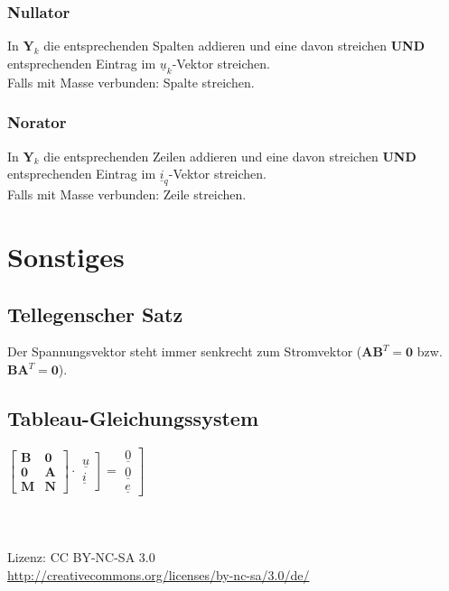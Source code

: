 \documentclass[a4paper,twocolumn,10pt]{article}
\begin{document}
\subsubsection*{Nullator}
In $\textbf{Y}_k$ die entsprechenden Spalten addieren und eine davon streichen \textbf{UND} entsprechenden Eintrag im $\underline{u}_k$-Vektor streichen.\\
Falls mit Masse verbunden: Spalte streichen.
\subsubsection*{Norator}
In $\textbf{Y}_k$ die entsprechenden Zeilen addieren und eine davon streichen \textbf{UND} entsprechenden Eintrag im $\underline{i}_q$-Vektor streichen.\\
Falls mit Masse verbunden: Zeile streichen.

\section*{Sonstiges}
\subsection*{Tellegenscher Satz}
Der Spannungsvektor steht immer senkrecht zum Stromvektor ($\textbf{A}\textbf{B}^T=\textbf{0}$ bzw. $\textbf{B}\textbf{A}^T=\textbf{0}$).

\subsection*{Tableau-Gleichungssystem}
$\begin{bmatrix}\textbf{B} & \textbf{0} \\ \textbf{0} & \textbf{A} \\ \textbf{M} & \textbf{N}\end{bmatrix}\cdot \left.\begin{matrix}\underline{u}\\\underline{i}\end{matrix}\right]=\left.\begin{matrix}\underline{0}\\ \underline{0} \\ \underline{e}\end{matrix}\right]$
\\\\\\\\
Lizenz: CC BY-NC-SA 3.0\\
\url{http://creativecommons.org/licenses/by-nc-sa/3.0/de/}
\end{document}
